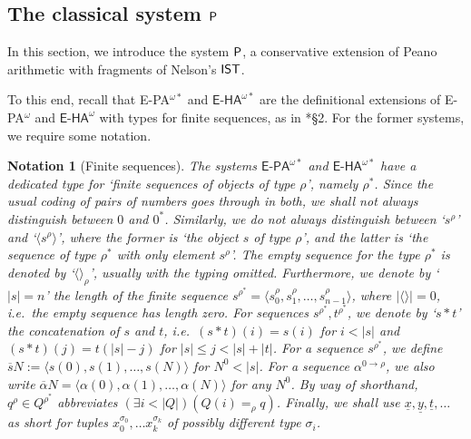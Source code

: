 \documentclass[reqno]{amsart}
\newtheorem{nota}[thm]{Notation}
\def\P{\textup{\textsf{P}}}
\def\di{\rightarrow}
\def\IST{\textup{\textsf{IST}}}
\numberwithin{equation}{section}
\numberwithin{thm}{section}
\begin{document}
\subsection{The classical system $\P$}\label{PIPI}
In this section, we introduce the system $\P$, a conservative extension of Peano arithmetic with fragments of Nelson's $\IST$.  

\medskip

To this end, recall that \textsf{E-PA}$^{\omega*}$ and $\textsf{E-HA}^{\omega*}$ are the definitional extensions of \textsf{E-PA}$^{\omega}$ and $\textsf{E-HA}^{\omega}$ with types for finite sequences, as in \cite{brie}*{\S2}.  For the former systems, we require some notation.  
\begin{nota}[Finite sequences]\label{skim}\rm
The systems $\textsf{E-PA}^{\omega*}$ and $\textsf{E-HA}^{\omega*}$ have a dedicated type for `finite sequences of objects of type $\rho$', namely $\rho^{*}$.  Since the usual coding of pairs of numbers goes through in both, we shall not always distinguish between $0$ and $0^{*}$.  %
Similarly, we do not always distinguish between `$s^{\rho}$' and `$\langle s^{\rho}\rangle$', where the former is `the object $s$ of type $\rho$', and the latter is `the sequence of type $\rho^{*}$ with only element $s^{\rho}$'.  The empty sequence for the type $\rho^{*}$ is denoted by `$\langle \rangle_{\rho}$', usually with the typing omitted.  Furthermore, we denote by `$|s|=n$' the length of the finite sequence $s^{\rho^{*}}=\langle s_{0}^{\rho},s_{1}^{\rho},\dots,s_{n-1}^{\rho}\rangle$, where $|\langle\rangle|=0$, i.e.\ the empty sequence has length zero.
For sequences $s^{\rho^{*}}, t^{\rho^{*}}$, we denote by `$s*t$' the concatenation of $s$ and $t$, i.e.\ $(s*t)(i)=s(i)$ for $i<|s|$ and $(s*t)(j)=t(|s|-j)$ for $|s|\leq j< |s|+|t|$. For a sequence $s^{\rho^{*}}$, we define $\overline{s}N:=\langle s(0), s(1), \dots,  s(N)\rangle $ for $N^{0}<|s|$.  
For a sequence $\alpha^{0\di \rho}$, we also write $\overline{\alpha}N=\langle \alpha(0), \alpha(1),\dots, \alpha(N)\rangle$ for \emph{any} $N^{0}$.  By way of shorthand, $q^{\rho}\in Q^{\rho^{*}}$ abbreviates $(\exists i<|Q|)(Q(i)=_{\rho}q)$.  Finally, we shall use $\underline{x}, \underline{y},\underline{t}, \dots$ as short for tuples $x_{0}^{\sigma_{0}}, \dots x_{k}^{\sigma_{k}}$ of possibly different type $\sigma_{i}$.          
\end{nota}    
\end{document}

